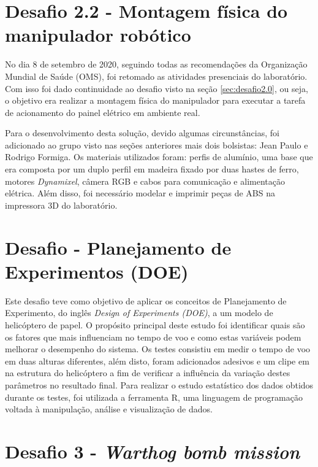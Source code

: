 \section{Desafio 2.2 - Montagem física do manipulador robótico}
\label{sec:desafio2.2}

No dia 8 de setembro de 2020, seguindo todas as recomendações da Organização Mundial de Saúde (OMS), foi retomado as atividades presenciais do laboratório. Com isso foi dado continuidade ao desafio visto na seção \ref{sec:desafio2.0}, ou seja, o objetivo era realizar a montagem física do manipulador para executar a tarefa de acionamento do painel elétrico em ambiente real.

Para o desenvolvimento desta solução, devido algumas circunstâncias, foi adicionado ao grupo visto nas seções anteriores mais dois bolsistas: Jean Paulo e Rodrigo Formiga. Os materiais utilizados foram: perfis de alumínio, uma base que era composta por um duplo perfil em madeira fixado por duas hastes de ferro, motores \textit{Dynamixel}, câmera RGB e cabos para comunicação e alimentação elétrica. Além disso, foi necessário modelar e imprimir peças de ABS na impressora 3D do laboratório.

\section{Desafio - Planejamento de Experimentos (DOE)}
\label{sec:DOE}

Este desafio teve como objetivo de aplicar os conceitos de Planejamento de Experimento, do inglês \textit{Design of Experiments (DOE)}, a um modelo de helicóptero de papel. O propósito principal deste estudo foi  identificar quais são os fatores que mais influenciam no tempo de voo e como estas variáveis podem melhorar o desempenho do sistema. Os testes consistiu em medir o tempo de voo em duas alturas diferentes, além disto, foram adicionados adesivos e um clipe em na estrutura do helicóptero a fim de verificar a influência da variação destes parâmetros no resultado final. Para realizar o estudo estatístico dos dados obtidos durante os testes, foi utilizada a ferramenta R, uma linguagem de programação voltada à manipulação, análise e visualização de dados.

\section{Desafio 3 - \textit{Warthog bomb mission}}

